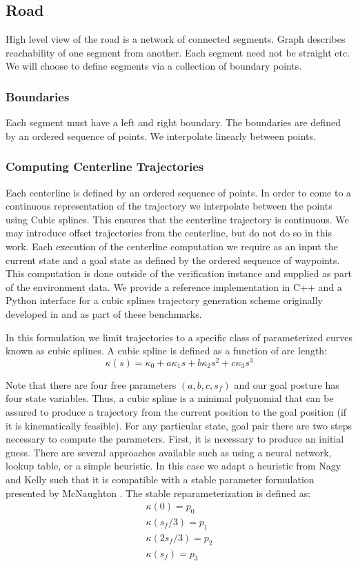 
\subsection{Road}
\label{sect:road}
High level view of the road is a network of connected segments. Graph describes reachability of one segment from another. Each segment need not be straight etc. We will choose to define segments via a collection of boundary points. 
\subsubsection{Boundaries}
Each segment must have a left and right boundary. The boundaries are defined by an ordered sequence of points. We interpolate linearly between points. 
\subsubsection{Computing Centerline Trajectories}
Each centerline is defined by an ordered sequence of points. In order to come to a continuous representation of the trajectory we interpolate between the points using Cubic splines. This ensures that the centerline trajectory is continuous. We may introduce offset trajectories from the centerline, but do not do so in this work. 
Each execution of the centerline computation we require as an input the current state and a goal state as defined by the ordered sequence of waypoints. This computation is done outside of the verification instance and supplied as part of the environment data. We provide a reference implementation in C++ and a Python interface for a cubic splines trajectory generation scheme originally developed in \cite{nagy2001trajectory} and \cite{McNaughton_2011_6927} as part of these benchmarks. 

In this formulation we limit trajectories to a specific class of parameterized curves known as cubic splines. A cubic spline is defined as a function of arc length:
\begin{equation}
\kappa(s) = \kappa_0 + a \kappa_1 s + b \kappa_2 s^2 + c \kappa_3 s^3
\end{equation}

Note that there are four free parameters $(a,b,c,s_f)$ and our goal posture has four state variables. Thus, a cubic spline is a minimal polynomial that can be assured to produce a trajectory from the current position to the goal position (if it is kinematically feasible). For any particular state, goal pair there are two steps necessary to compute the parameters. First, it is necessary to produce an initial guess. There are several approaches available such as using a neural network, lookup table, or a simple heuristic. In this case we adapt a heuristic from Nagy and Kelly \cite{nagy2001trajectory} such that it is compatible with a stable parameter formulation presented by McNaughton \cite{McNaughton_2011_6927}. The stable reparameterization is defined as:
\begin{gather}
\kappa(0)=p_0\\
\kappa(s_f/3)=p_1\\
\kappa(2s_f/3)=p_2\\
\kappa(s_f)=p_3
\end{gather}

